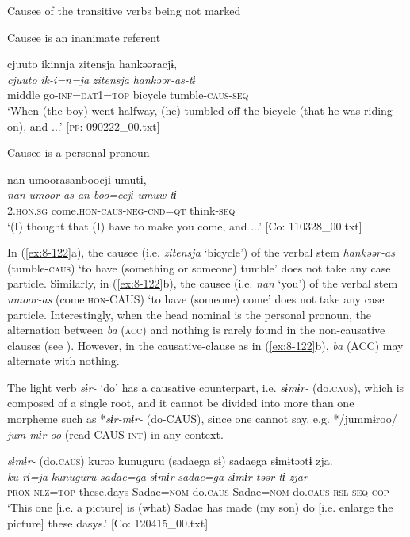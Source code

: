 \ea\label{ex:8-122}
  Causee of the transitive verbs being not marked

\ea Causee is an inanimate referent

  {\TM}
\glll  cjuuto  ikinnja  {\textbar}zitensja{\textbar}  hankəəracjɨ,\\
\textit{cjuuto}  \textit{ik-i=n=ja}  \textit{zitensja}  \textit{hankəər-as-tɨ}\\
    middle  go-\textsc{inf}=\textsc{dat1}=\textsc{top}  bicycle  tumble-\textsc{caus}-\textsc{seq}\\
\glt ‘When (the boy) went halfway, (he) tumbled off the bicycle (that he was riding on), and ...’ [\textsc{pf}: 090222\_00.txt]


\ex Causee is a personal pronoun

  {\TM}
\glll  nan  umoorasanboocjɨ  umutɨ,\\
\textit{nan}  \textit{umoor-as-an-boo=ccjɨ  umuw-tɨ}\\
    2.\textsc{hon}.\textsc{sg}  come.\textsc{hon}-\textsc{caus}-\textsc{neg}-\textsc{cnd}=\textsc{qt}  think-\textsc{seq}\\
\glt ‘(I) thought that (I) have to make you come, and ...’ [Co: 110328\_00.txt]
\z
\z

In (\ref{ex:8-122}a), the causee (i.e. \textit{zitensja} ‘bicycle’) of the verbal stem \textit{hankəər-as} (tumble-\textsc{caus}) ‘to have (something or someone) tumble’ does not take any case particle. Similarly, in (\ref{ex:8-122}b), the causee (i.e. \textit{nan} ‘you’) of the verbal stem \textit{umoor-as} (come.\textsc{hon}-CAUS) ‘to have (someone) come’ does not take any case particle. Interestingly, when the head nominal is the personal pronoun, the alternation between \textit{ba} (\textsc{acc}) and nothing is rarely found in the non-causative clauses (see ). However, in the causative-clause as in (\ref{ex:8-122}b), \textit{ba} (ACC) may alternate with nothing.

  The light verb \textit{sɨr-} ‘do’ has a causative counterpart, i.e. \textit{sɨmɨr-} (do.\textsc{caus}), which is composed of a single root, and it cannot be divided into more than one morpheme such as *\textit{sɨr-mɨr-} (do-CAUS), since one cannot say, e.g. */jummɨroo/ \textit{jum-mɨr-oo} (read-CAUS-\textsc{int}) in any context.

\ea\label{ex:8-123}
  \textit{sɨmɨr-} (do.\textsc{caus})
\ea
{\TM}
\glll  kurəə  kunuguru  (sadaega  sɨ)   sadaega  sɨmɨtəətɨ  zja.\\
\textit{ku-rɨ=ja}  \textit{kunuguru}  \textit{sadae=ga}  \textit{sɨmɨr}    \textit{sadae=ga}  \textit{sɨmɨr-təər-tɨ  zjar}\\
\textsc{prox}-\textsc{nlz}=\textsc{top}  these.days  Sadae=\textsc{nom}  do.\textsc{caus}  Sadae=\textsc{nom}  do.\textsc{caus}-\textsc{rsl}-\textsc{seq}  \textsc{cop}\\
\glt ‘This one [i.e. a picture] is (what) Sadae has made (my son) do [i.e. enlarge the picture] these dasys.’ [Co: 120415\_00.txt]

